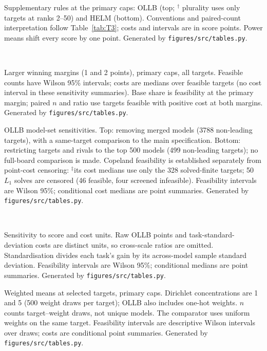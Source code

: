 \documentclass{article}
\begin{document}
\begin{table}[p]
\centering
\caption{Supplementary rules at the primary caps: OLLB (top; $^\dagger$ plurality uses only targets at ranks 2--50) and HELM (bottom). Conventions and paired-count interpretation follow Table~\ref{tab:T3}; costs and intervals are in score points. Power means shift every score by one point. Generated by \texttt{figures/src/tables.py}.}
\label{tab:supprules}
\\[6pt]

\end{table}
\begin{table}[p]
\centering
\caption{Larger winning margins (1 and 2 points), primary caps, all targets. Feasible counts have Wilson 95\% intervals; costs are medians over feasible targets (no cost interval in these sensitivity summaries). Base share is feasibility at the primary margin; paired $n$ and ratio use targets feasible with positive cost at both margins. Generated by \texttt{figures/src/tables.py}.}
\label{tab:margin}

\end{table}
\begin{table}[p]
\centering
\caption{OLLB model-set sensitivities. Top: removing merged models (3788 non-leading targets), with a same-target comparison to the main specification. Bottom: restricting targets and rivals to the top 500 models (499 non-leading targets); no full-board comparison is made. Copeland feasibility is established separately from point-cost censoring: $^\ddagger$its cost medians use only the 328 solved-finite targets; 50 $L_1$ solves are censored (46 feasible, four screened infeasible). Feasibility intervals are Wilson 95\%; conditional cost medians are point summaries. Generated by \texttt{figures/src/tables.py}.}
\label{tab:slices}
\\[6pt]

\end{table}
\begin{table}[p]
\centering
\caption{Sensitivity to score and cost units. Raw OLLB points and task-standard-deviation costs are distinct units, so cross-scale ratios are omitted. Standardisation divides each task's gain by its across-model sample standard deviation. Feasibility intervals are Wilson 95\%; conditional medians are point summaries. Generated by \texttt{figures/src/tables.py}.}
\label{tab:scale}

\end{table}
\begin{table}[p]
\centering
\caption{Weighted means at selected targets, primary caps. Dirichlet concentrations are 1 and 5 (500 weight draws per target); OLLB also includes one-hot weights. $n$ counts target--weight draws, not unique models. The comparator uses uniform weights on the same target. Feasibility intervals are descriptive Wilson intervals over draws; costs are conditional point summaries. Generated by \texttt{figures/src/tables.py}.}
\label{tab:weights}

\end{table}
\end{document}
